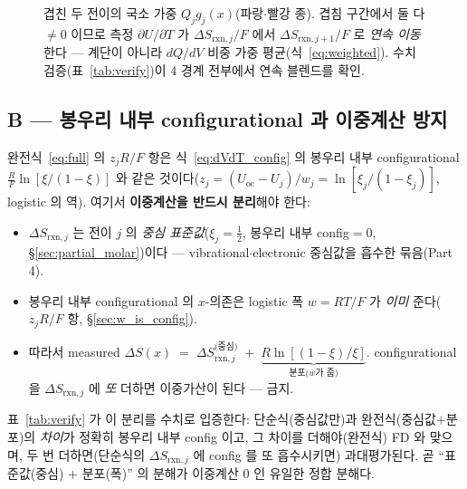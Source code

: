 \documentclass[11pt,a4paper]{article}
\newcommand{\rxn}{\mathrm{rxn}}
\newcommand{\oc}{\mathrm{oc}}
\begin{document}
\begin{figure}[t]
\centering
{}
\caption{겹친 두 전이의 국소 가중 $Q_jg_j(x)$(파랑$\cdot$빨강 종). 겹침 구간에서 둘 다 $\ne0$ 이므로 측정
$\partial U/\partial T$ 가 $\Delta S_{\rxn,j}/F$ 에서 $\Delta S_{\rxn,j+1}/F$ 로 \emph{연속 이동}한다 — 계단이
아니라 $dQ/dV$ 비중 가중 평균(식~\eqref{eq:weighted}). 수치 검증(표~\ref{tab:verify})이 4 경계 전부에서
연속 블렌드를 확인.}
\label{fig:overlap}
\end{figure}

\subsection{B — 봉우리 내부 configurational 과 이중계산 방지}\label{sec:doublecountB}
완전식~\eqref{eq:full} 의 $z_jR/F$ 항은 식~\eqref{eq:dVdT_config} 의 봉우리 내부 configurational
$\tfrac{R}{F}\ln[\xi/(1-\xi)]$ 와 같은 것이다($z_j=(U_\oc-U_j)/w_j=\ln[\xi_j/(1-\xi_j)]$, logistic 의
역). 여기서 \textbf{이중계산을 반드시 분리}해야 한다:
\begin{itemize}[leftmargin=1.6em,itemsep=3pt]
\item $\Delta S_{\rxn,j}$ 는 전이 $j$ 의 \emph{중심 표준값}($\xi_j=\tfrac12$, 봉우리 내부 config$=0$,
\S\ref{sec:partial_molar})이다 — vibrational$\cdot$electronic 중심값을 흡수한 묶음(Part 4).
\item 봉우리 내부 configurational 의 $x$-의존은 logistic 폭 $w=RT/F$ 가 \emph{이미} 준다($z_jR/F$ 항,
\S\ref{sec:w_is_config}).
\item 따라서 measured $\Delta S(x)\;=\;\Delta S_{\rxn,j}^{\text{(중심)}}\;+\;\underbrace{R\ln[(1-\xi)/\xi]}_{\text{분포(}w\text{가 줌)}}$.
configurational 을 $\Delta S_{\rxn,j}$ 에 \emph{또} 더하면 이중가산이 된다 — 금지.
\end{itemize}
표~\ref{tab:verify} 가 이 분리를 수치로 입증한다: 단순식(중심값만)과 완전식(중심값$+$분포)의 \emph{차이}가
정확히 봉우리 내부 config 이고, 그 차이를 더해야(완전식) FD 와 맞으며, 두 번 더하면(단순식의
$\Delta S_{\rxn,j}$ 에 config 를 또 흡수시키면) 과대평가된다. 곧 ``표준값(중심) $+$ 분포(폭)'' 의 분해가
이중계산 $0$ 인 유일한 정합 분해다.
\end{document}
